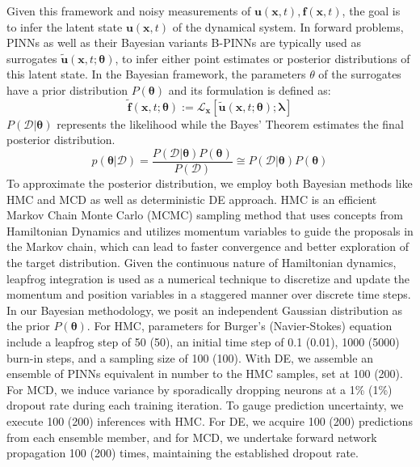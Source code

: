 \documentclass{article}
\begin{document}
Given this framework and noisy measurements of $\mathbf{u}(\mathbf{x},t), \mathbf{f} (\mathbf{x},t)$, the goal is to infer the latent state $\mathbf{u}( \mathbf{x},t)$ of the dynamical system. In forward problems, PINNs as well as their Bayesian variants B-PINNs are typically used as surrogates 
$\widetilde{\mathbf{u}}(\mathbf{x}, t; \mathbf{\theta})$, to infer either point estimates or posterior distributions of this latent state. In the Bayesian framework, the parameters $\theta$ of the surrogates have a prior distribution $P(\mathbf{\theta})$ and its formulation is defined as: 
\begin{equation}
\widetilde{\mathbf{f}}(\mathbf{x}, t; \mathbf{\theta}) := \mathbf{\mathcal{L}}_{\mathbf{x}} [\widetilde{\mathbf{u}}(\mathbf{x}, t; \mathbf{\theta});\mathbf{\lambda}]
\end{equation}
$P(\mathcal{D}|\mathbf{\theta})$ represents the likelihood while the Bayes' Theorem estimates the final posterior distribution. 
\begin{equation}
p(\mathbf{\theta} | \mathcal{D}) = \frac{P(\mathcal{D}|\mathbf{\theta})P(\mathbf{\theta})}{P(\mathcal{D})} \cong P(\mathcal{D}|\mathbf{\theta})P(\mathbf{\theta})
\end{equation}
\vspace{-0.15cm}
To approximate the posterior distribution, we employ both Bayesian methods like HMC and MCD as well as deterministic DE approach. HMC is an efficient Markov Chain Monte Carlo (MCMC) sampling method that uses concepts from Hamiltonian Dynamics and utilizes momentum variables to guide the proposals in the Markov chain, which can lead to faster convergence and better exploration of the target distribution. Given the continuous nature of Hamiltonian dynamics, leapfrog integration is used as a numerical technique to discretize and update the momentum and position variables in a staggered manner over discrete time steps. In our Bayesian methodology, we posit an independent Gaussian distribution as the prior $P(\mathbf{\theta})$. For HMC, parameters for Burger's (Navier-Stokes) equation include a leapfrog step of 50 (50), an initial time step of 0.1 (0.01), 1000 (5000) burn-in steps, and a sampling size of 100 (100). With DE, we assemble an ensemble of PINNs equivalent in number to the HMC samples, set at 100 (200). For MCD, we induce variance by sporadically dropping neurons at a 1\% (1\%) dropout rate during each training iteration. To gauge prediction uncertainty, we execute 100 (200) inferences with HMC. For DE, we acquire 100 (200) predictions from each ensemble member, and for MCD, we undertake forward network propagation 100 (200) times, maintaining the established dropout rate.
\end{document}
